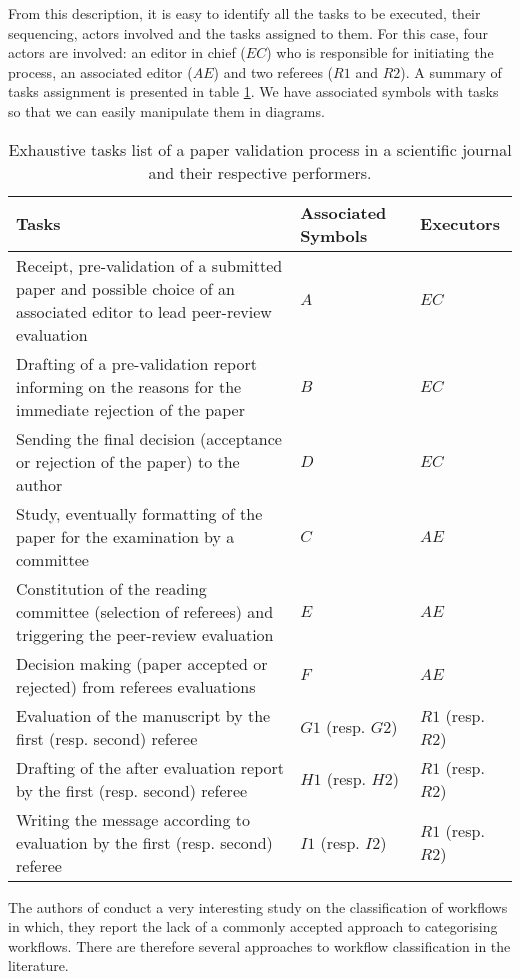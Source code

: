From this description, it is easy to identify all the tasks to be executed, their sequencing, actors involved and the tasks assigned to them. For this case, four actors are involved: an editor in chief ($EC$) who is responsible for initiating the process, an associated editor ($AE$) and two referees ($R1$ and $R2$).
A summary of tasks assignment is presented in table \ref{tableau:tachesExecutant}. We have associated symbols with tasks so that we can easily manipulate them in diagrams. 
\begin{table}[ht]
	\caption{Exhaustive tasks list of a paper validation process in a scientific journal and their respective performers.}
	\label{tableau:tachesExecutant}
	\begin{tabular}[t]{|m{8.4cm}|m{2.7cm}|m{2.63cm}|}
		\hline
		\textbf{Tasks} & \textbf{Associated Symbols}  & \textbf{Executors} \\
		\hline
		Receipt, pre-validation of a submitted paper and possible choice of an associated editor to lead peer-review evaluation & $A$  & $EC$\\
		\hline
		Drafting of a pre-validation report informing on the reasons for the immediate rejection of the paper & $B$ & $EC$ \\
		\hline
		Sending the final decision (acceptance or rejection of the paper) to the author & $D$ & $EC$ \\
		\hline
		Study, eventually formatting of the paper for the examination by a committee & $C$ & $AE$ \\
		\hline
		Constitution of the reading committee (selection of referees) and triggering the peer-review evaluation & $E$ & $AE$ \\
		\hline
		Decision making (paper accepted or rejected) from referees evaluations & $F$ & $AE$ \\
		\hline
		Evaluation of the manuscript by the first (resp. second) referee & $G1$ (resp. $G2$) & $R1$ (resp. $R2$) \\
		\hline
		Drafting of the after evaluation report by the first (resp. second) referee & $H1$ (resp. $H2$) & $R1$ (resp. $R2$) \\
		\hline
		Writing the message according to evaluation by the first (resp. second) referee & $I1$ (resp. $I2$) & $R1$ (resp. $R2$) \\
		\hline
	\end{tabular}
\end{table}




\label{chap1:sec:workflow-typology}
The authors of \cite{workflow95} conduct a very interesting study on the classification of workflows in which, they report the lack of a commonly accepted approach to categorising workflows. There are therefore several approaches to workflow classification in the literature.

